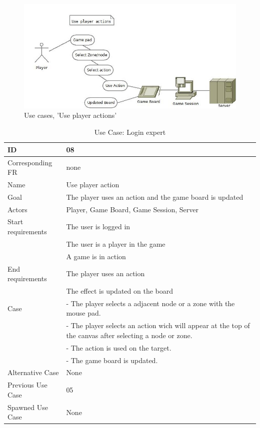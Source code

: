 \begin{figure}[H]
  \centering
    \includegraphics[width=1.0\textwidth]{img/useplayeractions.jpg}
  \caption{Use cases, 'Use player actions'} 
  \label{fig:useplayeractions}
\end{figure}


\begin{table}[H]
\begin{tabular}{|l|p{14cm}|}
\hline
	\textbf{ID} & \textbf{08}\\ \hline
	Corresponding FR & none\\ \hline
	Name & Use player action \\ \hline
	Goal & The player uses an action and the game board is updated\\ \hline
	Actors & Player, Game Board, Game Session, Server \\ \hline
	Start requirements & The user is logged in \\
				& The user is a player in the game\\
				& A game is in action\\ \hline
	End requirements & The player uses an action \\
				& The effect is updated on the board \\ \hline
	Case &- The player selects a adjacent node or a zone with the mouse pad.\\
		&- The player selects an action wich will appear at the top of the canvas after selecting a node or zone.\\
		&- The action is used on the target.\\
		&- The game board is updated.\\ \hline
	Alternative Case & None\\ \hline
	Previous Use Case & 05\\ \hline
	Spawned Use Case & None\\ \hline
\end{tabular}
\caption{Use Case: Login expert}
\label{fig:usecase08table}
\end{table}



